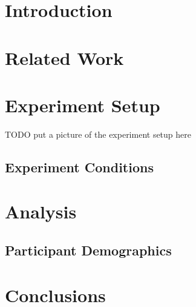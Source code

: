 \documentclass[]{article}
\title{}
\author{}
\begin{document}
\maketitle

\begin{abstract}

\end{abstract}

\section{Introduction}

\section{Related Work}

\section{Experiment Setup}

TODO put a picture of the experiment setup here

\subsection{Experiment Conditions}

\section{Analysis}

\subsection{Participant Demographics}

\section{Conclusions}



\end{document}
